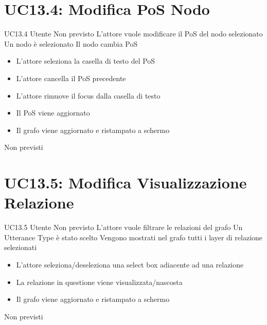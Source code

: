\documentclass[../AnalisideiRequisiti.tex]{subfiles}
\begin{document}
\section{UC13.4: Modifica PoS Nodo}
\UserCase
{UC13.4}
{Utente}
{Non previsto}
{L'attore vuole modificare il PoS del nodo selezionato}
{Un nodo è selezionato }
{Il nodo cambia PoS}
{
	\begin{itemize}
		\item{} L'attore seleziona la casella di testo del PoS
		\item{} L'attore cancella il PoS precedente
		\item{} L'attore rimuove il focus dalla casella di testo
		\item{} Il PoS viene aggiornato
		\item{} Il grafo viene aggiornato e ristampato a schermo 
	\end{itemize}
}
{Non previsti}

\section{UC13.5: Modifica Visualizzazione Relazione}
\UserCase
{UC13.5}
{Utente}
{Non previsto}
{L'attore vuole filtrare le relazioni del grafo}
{Un Utterance Type è stato scelto }
{Vengono mostrati nel grafo tutti i layer di relazione selezionati}
{
	\begin{itemize}
		\item{} L'attore seleziona/deseleziona una select box adiacente ad una relazione
		\item{} La relazione in questione viene visualizzata/nascosta
		\item{} Il grafo viene aggiornato e ristampato a schermo 
	\end{itemize}
}
{Non previsti}
\end{document}
